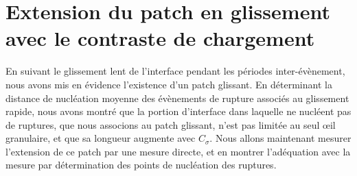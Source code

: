 

\section[Extension du patch en glissement avec le contraste de chargement]{\fontsize{15}{12}\selectfont Extension du patch en glissement avec le contraste de chargement}
\label{sec:longueurpatch}



En suivant le glissement lent de l'interface pendant les périodes inter-évènement, nous avons mis en évidence l'existence d'un patch glissant. En déterminant la distance de nucléation moyenne des évènements de rupture associés au glissement rapide, nous avons montré que la portion d'interface dans laquelle ne nucléent pas de ruptures, que nous associons au patch glissant, n'est pas limitée au seul œil granulaire, et que sa longueur augmente avec $C_\sigma$. Nous allons maintenant mesurer l'extension de ce patch par une mesure directe, et en montrer l'adéquation avec la mesure par détermination des points de nucléation des ruptures.


